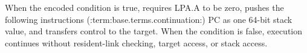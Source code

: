 When the encoded condition is true, requires LPA.A to be zero, pushes the following instruction\textquotesingle{}s (:term:base.terms.continuation:) PC as one 64-bit stack value, and transfers control to the target. When the condition is false, execution continues without resident-link checking, target access, or stack access.

